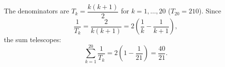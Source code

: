 The denominators are $T_k=\dfrac{k(k+1)}{2}$ for $k=1,\dots,20$ ($T_{20}=210$). Since
\[
\dfrac{1}{T_k}=\dfrac{2}{k(k+1)}=2\left(\dfrac{1}{k}-\dfrac{1}{k+1}\right),
\]
the sum telescopes:
\[
\sum_{k=1}^{20}\dfrac{1}{T_k}=2\left(1-\dfrac{1}{21}\right)=\boxed{\dfrac{40}{21}} .
\]
